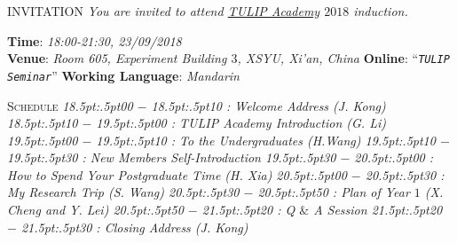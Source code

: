 \documentclass{article}
\begin{document}
%

\obeylines%
\vspace{.8cm}
{ INVITATION}
\medbreak
\textit{%
  You are invited to attend \href{http://www.tulip.org.au}{TULIP Academy} $2018$ induction.
}


{\scshape }

\textbf{Time}:  \textit{18:00-21:30, 23/09/2018} \\ %
\textbf{Venue}: \textit{Room 605, Experiment Building $3$, XSYU, Xi'an, China}
\textbf{Online}: ``\textit{\texttt{TULIP Seminar}}''
\textbf{Working Language}: \textit{Mandarin}

{\scshape  Schedule}
\textit{%
\footnotesize{
  18\kern.5pt:\kern.5pt00 $-$ 18\kern.5pt:\kern.5pt10 : Welcome Address (J. Kong)
  18\kern.5pt:\kern.5pt10 $-$ 19\kern.5pt:\kern.5pt00 : TULIP Academy Introduction (G. Li)
  19\kern.5pt:\kern.5pt00 $-$ 19\kern.5pt:\kern.5pt10 : To the Undergraduates (H.Wang)
  19\kern.5pt:\kern.5pt10 $-$ 19\kern.5pt:\kern.5pt30 : New Members Self-Introduction
  19\kern.5pt:\kern.5pt30 $-$ 20\kern.5pt:\kern.5pt00 : How to Spend Your Postgraduate Time (H. Xia)
  20\kern.5pt:\kern.5pt00 $-$ 20\kern.5pt:\kern.5pt30 : My Research Trip (S. Wang)
  20\kern.5pt:\kern.5pt30 $-$ 20\kern.5pt:\kern.5pt50 : Plan of Year $1$ (X. Cheng and Y. Lei)
  20\kern.5pt:\kern.5pt50 $-$ 21\kern.5pt:\kern.5pt20 : Q $\&$ A Session
  21\kern.5pt:\kern.5pt20 $-$ 21\kern.5pt:\kern.5pt30 : Closing Address (J. Kong)}
}
\end{document}
